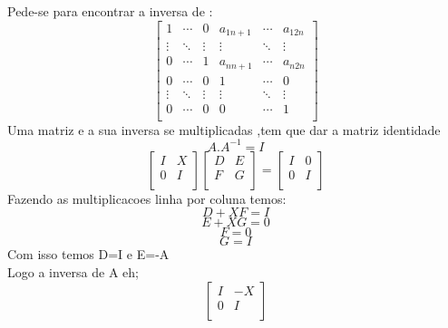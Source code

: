 \documentclass[100pt]{article}
\begin{document}
Pede-se para encontrar a inversa de :
$$\left[\begin{array}{cccrll}
1 & \cdots & 0 & a_{1 n+1} & \cdots & a_{1 2n}\\
\vdots & \ddots & \vdots &\vdots & \ddots &\vdots\\
0 & \cdots & 1 & a_{n n+1} & \cdots & a_{n 2n}\\
0 & \cdots & 0 & 1 & \cdots & 0\\
\vdots & \ddots & \vdots &\vdots& \ddots &\vdots\\
0 & \cdots & 0 & 0 & \cdots & 1\\
\end{array}\right]$$
Uma matriz e a sua inversa se multiplicadas ,tem que dar a matriz identidade
$$A.A^{-1}=I$$
$$\left[\begin{array}{ccrll}
I & X\\
0 & I\\
\end{array}\right]
\left[\begin{array}{ccrll}
D & E\\
F & G\\
\end{array}\right]
=
\left[\begin{array}{ccrll}
I & 0\\
0 & I\\
\end{array}\right]
$$
Fazendo as multiplicacoes linha por coluna temos:\\

$$D+XF=I$$
$$E+XG=0$$
$$F=0$$ 
$$G=I 
$$
Com isso temos D=I e E=-A \\
Logo a inversa de A eh;
$$\left[\begin{array}{ccrll}
I & -X\\
0 & I\\
\end{array}\right]$$
\end{document}
